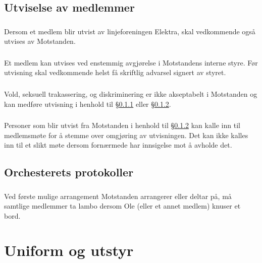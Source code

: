\documentclass{article}
\newenvironment{statute}[1][]
    {
        \titleformat{\subsubsection}[runin]{\normalfont}{\hspace{1pt}\textit{\S\hspace{5pt}\thesubsubsection}}{0pt}{\rule{4pt}{0pt}}{}
        \subsubsection{}#1
        \begin{minipage}[t]{0.89\linewidth}
    }
    {
        \end{minipage}
        
        \ignorespacesafterend
    }
\begin{document}
        \subsection{Utviselse av medlemmer}
        	\begin{statute}[\label{utvisning_av_elektrastyret}]
        		Dersom et medlem blir utvist av linjeforeningen Elektra, skal vedkommende også utvises av Motstanden.
        	\end{statute}
            \begin{statute}[\label{utvisning_av_styret}]
                Et medlem kan utvises ved enstemmig avgjørelse i Motstandens interne styre. Før utvisning skal vedkommende helst få skriftlig advarsel signert av styret.
            \end{statute}
            \begin{statute}
                Vold, seksuell trakassering, og diskriminering er ikke akseptabelt i Motstanden og kan medføre utvisning i henhold til \S\hspace{3pt}\ref{utvisning_av_elektrastyret} eller  \S\hspace{3pt}\ref{utvisning_av_styret}.
            \end{statute}
			\begin{statute}
				Personer som blir utvist fra Motstanden i henhold til \S\hspace{3pt}\ref{utvisning_av_styret} kan kalle inn til medlemsmøte for å stemme over omgjøring av utvisningen. Det kan ikke kalles inn til et slikt møte dersom fornærmede har innsigelse mot å avholde det.
			\end{statute}

        \subsection{Orchesterets protokoller}
            \begin{statute}
                Ved første mulige arrangement Motstanden arrangerer eller deltar på, må samtlige medlemmer ta lambo dersom Ole (eller et annet medlem) knuser et bord.     
            \end{statute}
        
    \section{Uniform og utstyr}
\end{document}
